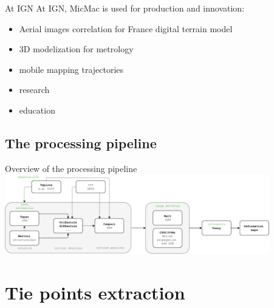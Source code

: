 \documentclass{beamer}
\begin{document}
		\begin{frame}{At IGN}
		At IGN, MicMac is used for production and innovation:
		\begin{itemize}
			\item  Aerial images correlation for France digital terrain model
  			\item  3D modelization for metrology
  			\item  mobile mapping trajectories
  			\item  research
  			\item  education 
		\end{itemize}
		\end{frame}
		
		   
        \subsection*{The processing pipeline}
            \begin{frame}{Overview of the processing pipeline}
                \centering
                \includegraphics[width=11.5cm]{images/MicMac_architecture.pdf}
                
                
            \end{frame}


\section{Tie points extraction}
\end{document}
